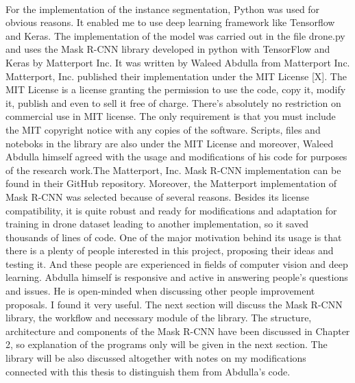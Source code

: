\paragraph{}
For the implementation of the instance segmentation, Python was used for obvious reasons. It enabled me to use deep learning framework like Tensorflow and Keras. The implementation of the model was carried out in the file drone.py and uses the Mask R-CNN library developed in python with TensorFlow and Keras by Matterport Inc. It was written by Waleed Abdulla from Matterport Inc. Matterport, Inc. published their implementation under the MIT License [X]. The MIT License is a license granting the permission to use the code, copy it, modify it, publish and even to sell it free of charge.
There's absolutely no restriction on commercial use in MIT license. The only requirement is that you must include the MIT copyright notice with any copies of the software. Scripts, files and noteboks in the library are also under the MIT License and moreover, Waleed Abdulla himself agreed with the usage and modifications of his code for purposes of the research work.The Matterport, Inc. Mask R-CNN implementation can be found in their GitHub repository.
Moreover, the Matterport implementation of Mask R-CNN was selected because of several reasons. Besides its license compatibility, it is quite robust and ready for modifications and adaptation for training in drone dataset leading to another implementation, so it saved thousands of lines of code. One of the major motivation behind its usage is that there is a plenty of people interested in this project, proposing their ideas and testing it. And these people are experienced in fields of computer vision and deep learning. Abdulla himself is responsive and active in answering people’s questions and issues. He is open-minded when discussing other people improvement proposals. I found it very useful.
The next section will discuss the Mask R-CNN library, the workflow and necessary module of the library. The structure, architecture and components of the Mask R-CNN have been discussed in Chapter 2, so explanation of the programs only will be given in the next section. The library will be also discussed altogether with notes on my modifications connected with this thesis to distinguish them from Abdulla’s code.

